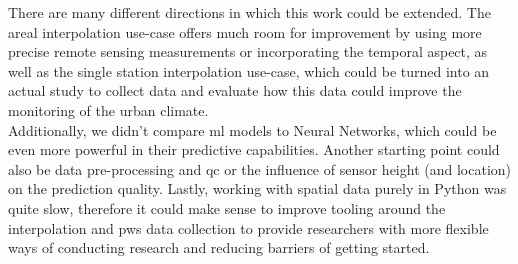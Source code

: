 There are many different directions in which this work could be extended. The areal interpolation use-case offers much room for improvement by using more precise remote sensing measurements or incorporating the temporal aspect, as well as the single station interpolation use-case, which could be turned into an actual study to collect data and evaluate how this data could improve the monitoring of the urban climate.\\
Additionally, we didn't compare \gls{ml} models to Neural Networks, which could be even more powerful in their predictive capabilities. Another starting point could also be data pre-processing and \gls{qc} or the influence of sensor height (and location) on the prediction quality. Lastly, working with spatial data purely in Python was quite slow, therefore it could make sense to improve tooling around the interpolation and \gls{pws} data collection to provide researchers with more flexible ways of conducting research and reducing barriers of getting started.